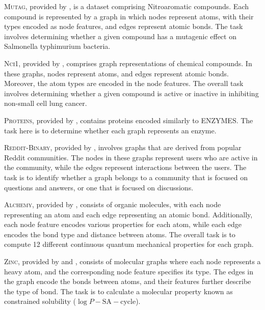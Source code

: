 \textsc{Mutag}, provided by \cite{Debnath1991}, is a dataset comprising Nitroaromatic compounds. Each compound is represented by a graph in which nodes represent atoms, with their types encoded as node features, and edges represent atomic bonds. The task involves determining whether a given compound has a mutagenic effect on Salmonella typhimurium bacteria. \newline

\textsc{Nci1}, provided by \cite{Wale2008}, comprises graph representations of chemical compounds. In these graphs, nodes represent atoms, and edges represent atomic bonds. Moreover, the atom types are encoded in the node features. The overall task involves determining whether a given compound is active or inactive in inhibiting non-small cell lung cancer.\newline

\textsc{Proteins}, provided by \cite{Borgwardt2005}, contains proteins encoded similarly to ENZYMES. The task here is to determine whether each graph represents an enzyme. \newline

\textsc{Reddit-Binary}, provided by \cite{Yanardag2015}, involves graphs that are derived from popular Reddit communities. The nodes in these graphs represent users who are active in the community, while the edges represent interactions between the users. The task is to identify whether a graph belongs to a community that is focused on questions and answers, or one that is focused on discussions. \newline

\textsc{Alchemy}, provided by \cite{Chen2019alchemy}, consists of organic molecules, with each node representing an atom and each edge representing an atomic bond. Additionally, each node feature encodes various properties for each atom, while each edge encodes the bond type and distance between atoms. The overall task is to compute 12 different continuous quantum mechanical properties for each graph. \newline

\textsc{Zinc}, provided by \cite{Bresson2019} and \cite{Irwin2012}, consists of molecular graphs where each node represents a heavy atom, and the corresponding node feature specifies its type. The edges in the graph encode the bonds between atoms, and their features further describe the type of bond. The task is to calculate a molecular property known as constrained solubility ($\log P - \text{SA} - \text{cycle}$).\newline

